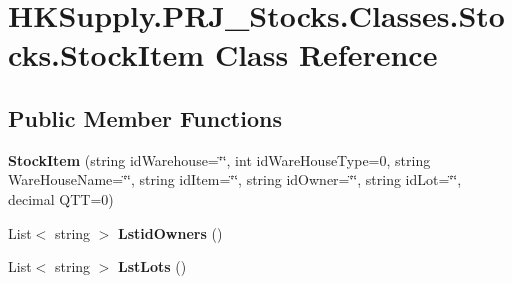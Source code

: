 \hypertarget{class_h_k_supply_1_1_p_r_j___stocks_1_1_classes_1_1_stocks_1_1_stock_item}{}\section{H\+K\+Supply.\+P\+R\+J\+\_\+\+Stocks.\+Classes.\+Stocks.\+Stock\+Item Class Reference}
\label{class_h_k_supply_1_1_p_r_j___stocks_1_1_classes_1_1_stocks_1_1_stock_item}
\subsection*{Public Member Functions}
\begin{DoxyCompactItemize}
\item 
\mbox{\label{class_h_k_supply_1_1_p_r_j___stocks_1_1_classes_1_1_stocks_1_1_stock_item_ad3043b41c8a6a5392f82044c053ffeca}} 
{\bfseries Stock\+Item} (string id\+Warehouse=\char`\"{}\char`\"{}, int id\+Ware\+House\+Type=0, string Ware\+House\+Name=\char`\"{}\char`\"{}, string id\+Item=\char`\"{}\char`\"{}, string id\+Owner=\char`\"{}\char`\"{}, string id\+Lot=\char`\"{}\char`\"{}, decimal Q\+TT=0)
\item 
\mbox{\label{class_h_k_supply_1_1_p_r_j___stocks_1_1_classes_1_1_stocks_1_1_stock_item_af3da7245ac778d55aef00a495ede3e0d}} 
List$<$ string $>$ {\bfseries Lstid\+Owners} ()
\item 
\mbox{\label{class_h_k_supply_1_1_p_r_j___stocks_1_1_classes_1_1_stocks_1_1_stock_item_ad59b9f9fdad532b10568b8f89785411d}} 
List$<$ string $>$ {\bfseries Lst\+Lots} ()
\end{DoxyCompactItemize}
